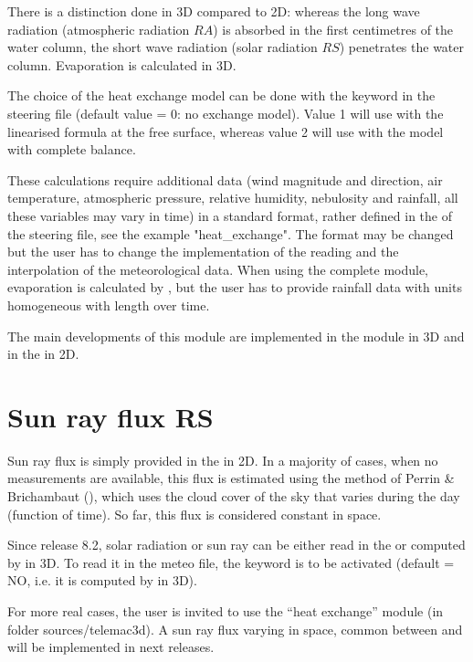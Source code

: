 There is a distinction done in 3D compared to 2D:
whereas the long wave radiation (atmospheric radiation $RA$) is absorbed in
the first centimetres of the water column, the short wave radiation (solar
radiation $RS$) penetrates the water column. Evaporation is calculated in 3D.

The choice of the heat exchange model can be done with the keyword
 in the \waqtel steering file
(default value = 0: no exchange
model). Value 1 will use with the linearised formula at the free surface,
whereas value 2 will use with the model with complete balance.

These calculations require additional data (wind magnitude and direction, air
temperature, atmospheric pressure, relative humidity, nebulosity and rainfall,
all these variables may vary in time) in a standard format, rather defined
in the  of the  steering file,
see the example "heat\_exchange".
The format may be changed but the user has to change the
implementation of the reading and the interpolation of the meteorological data.
When using the complete module, evaporation is calculated by , but
the user has to provide rainfall data with units homogeneous with length over
time.

The main developments of this module are implemented in the module
 in 3D and in the  in 2D.


\section{Sun ray flux RS}

Sun ray flux is simply provided in the  in 2D.
In a majority of cases, when no measurements are available,
this flux is estimated using the method of Perrin \& Brichambaut (\cite{El-Kadi2012}),
which uses the cloud cover of the sky that varies during the day (function of time).
So far, this flux is considered constant in space.

Since release 8.2, solar radiation or sun ray can be either read in the 
 or computed by \waqtel in 3D.
To read it in the meteo file, the keyword
 is to be activated (default = NO,
i.e. it is computed by \waqtel in 3D).

For more real cases, the user is invited to use the ``heat exchange'' module
(in folder sources/telemac3d).
A sun ray flux varying in space, common between  and  will be implemented in next releases.

